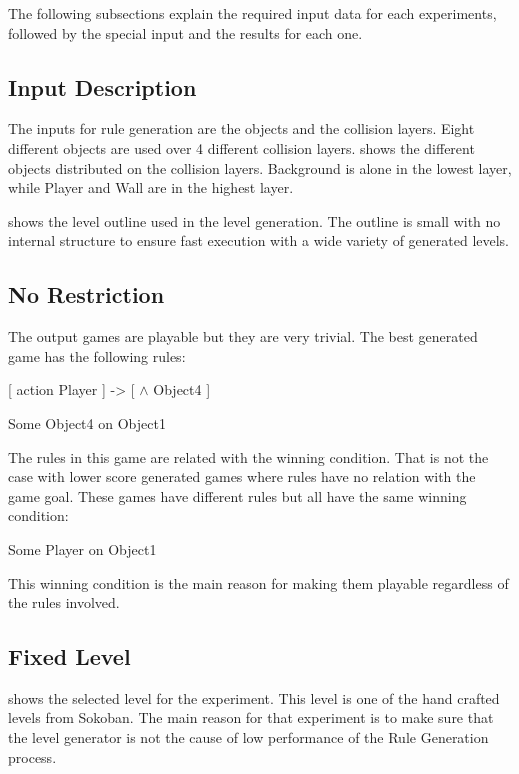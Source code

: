 The following subsections explain the required input data for each experiments, followed by the special input and the results for each one.

\subsection{Input Description}
The inputs for rule generation are the objects and the collision layers. Eight different objects are used over 4 different collision layers.  shows the different objects distributed on the collision layers. Background is alone in the lowest layer, while Player and Wall are in the highest layer.


 shows the level outline used in the level generation. The outline is small with no internal structure to ensure fast execution with a wide variety of generated levels.


\subsection{No Restriction}
The output games are playable but they are very trivial. The best generated game has the following rules:
\begin{center}
[ action Player ] -> [ $\wedge$ Object4 ]
\end{center}
\begin{center}
Some Object4 on Object1
\end{center}
The rules in this game are related with the winning condition. That is not the case with lower score generated games where rules have no relation with the game goal. These games have different rules but all have the same winning condition:
\begin{center}
Some Player on Object1
\end{center}
This winning condition is the main reason for making them playable regardless of the rules involved.

\subsection{Fixed Level}
 shows the selected level for the experiment. This level is one of the hand crafted levels from Sokoban. The main reason for that experiment is to make sure that the level generator is not the cause of low performance of the Rule Generation process.\\\par

